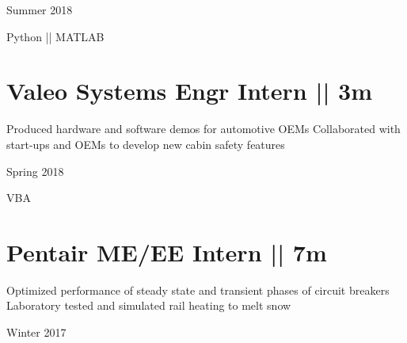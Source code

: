 \begin{subtitle}
\vspace{-7.8ex}
{{Summer 2018}}
\end{subtitle}
\vspace{0ex}

\vspace{-1.5ex}
{
\vspace{1.8ex}
\color{cyan}\small
{Python || MATLAB} %
}

\vspace{0.8ex}
\section
{\textbf{Valeo}
\newline
Systems Engr Intern || 3m}

\BulletItem
\vspace{-2.5ex}
\begin{detail}
\BulletItem
 Produced hardware and software demos for automotive OEMs
\BulletItem
 Collaborated with start-ups and OEMs to develop new cabin safety features
\end{detail}

\begin{subtitle}
\vspace{-7.8ex}
{{Spring 2018}}
\end{subtitle}

\vspace{-2ex}
{
\vspace{1.8ex}
\color{cyan}\small
{VBA} %
}

\vspace{0.8ex}
\section
{\textbf{Pentair}
\newline
ME/EE Intern  || 7m}

\BulletItem
\vspace{-2.5ex}
\begin{detail}

\BulletItem
 Optimized performance of steady state and transient phases of circuit breakers
\BulletItem
 Laboratory tested and simulated rail heating to melt snow
\end{detail}

\begin{subtitle}
\vspace{-7.8ex}
{{Winter 2017}}
\end{subtitle}
\vspace{0ex}

